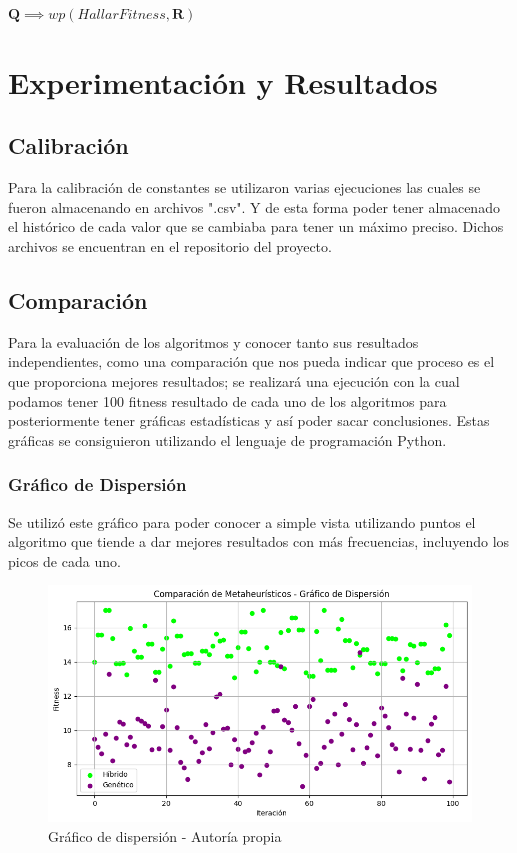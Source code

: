 \documentclass{article}
\begin{document}
\State $\textbf{Q} \implies wp(HallarFitness, \textbf{R})$

\section{Experimentación y Resultados}
\label{sec:exp}
\subsection{Calibración}

Para la calibración de constantes se utilizaron varias ejecuciones las cuales se fueron almacenando en archivos ".csv". Y de esta forma poder tener almacenado el histórico de cada valor que se cambiaba para tener un máximo preciso. Dichos archivos se encuentran en el repositorio del proyecto.

\subsection{Comparación}
Para la evaluación de los algoritmos y conocer tanto sus resultados independientes, como una comparación que nos pueda indicar que proceso es el que proporciona mejores resultados; se realizará una ejecución con la cual podamos tener 100 fitness resultado de cada uno de los algoritmos para posteriormente tener gráficas estadísticas y así poder sacar conclusiones. Estas gráficas se consiguieron utilizando el lenguaje de programación Python.

\subsubsection{Gráfico de Dispersión}

Se utilizó este gráfico para poder conocer a simple vista utilizando puntos el algoritmo que tiende a dar mejores resultados con más frecuencias, incluyendo los picos de cada uno.
\begin{figure}[H]
    \centering
    \includegraphics[width=1\linewidth]{imagenes/grafico_dispersion.png}
    \caption{Gráfico de dispersión - Autoría propia}
    \label{fig:enter-label}
\end{figure}
\end{document}
